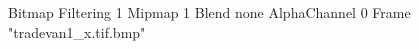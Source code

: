 {Bitmap
	{Filtering 1}
	{Mipmap 1}
	{Blend none}
	{AlphaChannel 0}
	{Frame "tradevan1_x.tif.bmp"}
}
